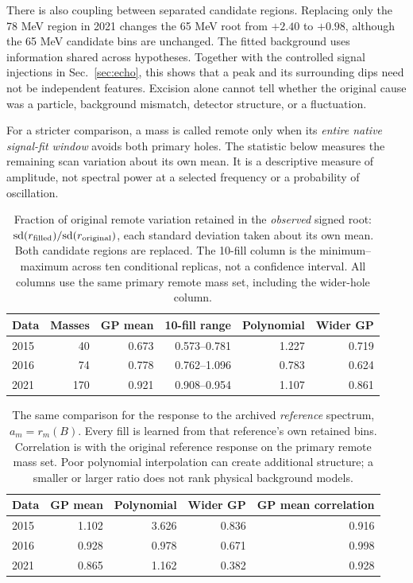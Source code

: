 There is also coupling between separated candidate regions. Replacing only the 78 MeV region in 2021 changes the 65 MeV root from $+2.40$ to $+0.98$, although the 65 MeV candidate bins are unchanged. The fitted background uses information shared across hypotheses. Together with the controlled signal injections in Sec.~\ref{sec:echo}, this shows that a peak and its surrounding dips need not be independent features. Excision alone cannot tell whether the original cause was a particle, background mismatch, detector structure, or a fluctuation.

For a stricter comparison, a mass is called remote only when its \emph{entire native signal-fit window} avoids both primary holes. The statistic below measures the remaining scan variation about its own mean. It is a descriptive measure of amplitude, not spectral power at a selected frequency or a probability of oscillation.
\begin{table}[H]
\centering\small
\begin{tabular}{lrrrrr}
\toprule
Data & Masses & GP mean & 10-fill range & Polynomial & Wider GP \\
\midrule
2015 & 40 & 0.673 & 0.573--0.781 & 1.227 & 0.719 \\
2016 & 74 & 0.778 & 0.762--1.096 & 0.783 & 0.624 \\
2021 & 170 & 0.921 & 0.908--0.954 & 1.107 & 0.861 \\
\bottomrule
\end{tabular}
\caption{Fraction of original remote variation retained in the \emph{observed} signed root: $\mathrm{sd}(r_{\rm filled})/\mathrm{sd}(r_{\rm original})$, each standard deviation taken about its own mean. Both candidate regions are replaced. The 10-fill column is the minimum--maximum across ten conditional replicas, not a confidence interval. All columns use the same primary remote mass set, including the wider-hole column.}\label{tab:removal-remote}
\end{table}

\begin{table}[H]
\centering\small
\begin{tabular}{lrrrr}
\toprule
Data & GP mean & Polynomial & Wider GP & GP mean correlation \\
\midrule
2015 & 1.102 & 3.626 & 0.836 & 0.916 \\
2016 & 0.928 & 0.978 & 0.671 & 0.998 \\
2021 & 0.865 & 1.162 & 0.382 & 0.928 \\
\bottomrule
\end{tabular}
\caption{The same comparison for the response to the archived \emph{reference} spectrum, $a_m=r_m(B)$. Every fill is learned from that reference's own retained bins. Correlation is with the original reference response on the primary remote mass set. Poor polynomial interpolation can create additional structure; a smaller or larger ratio does not rank physical background models.}\label{tab:removal-reference}
\end{table}

